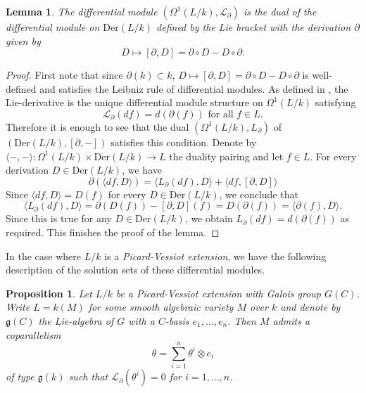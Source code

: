 \documentclass[12pt]{amsart}
\theoremstyle{definition}
\theoremstyle{plain}
\newtheorem{Prop}[defn]{Proposition}
\newtheorem{lem}[defn]{Lemma}
\theoremstyle{exampstyle}\newtheorem{thmx}{Theorem}
\theoremstyle{exampstyle}\newtheorem{thmxbis}{Theorem}
\begin{document}
\begin{lem} 
The differential module $(\Omega^1(L/k),\mathcal L_\partial)$ is the dual of the differential module on $\mathrm{Der}(L/k)$ defined by the Lie bracket with the derivation $\partial$ given by 
$$ D \mapsto  [\partial,D] = \partial \circ D - D \circ \partial.$$
\end{lem}  

\begin{proof} 
First note that since $\partial(k) \subset k$, $D \mapsto  [\partial,D] = \partial \circ D - D \circ \partial$ is well-defined and satisfies the Leibniz rule of differential modules. As defined in \cite{Rosenlicht}, the Lie-derivative is the unique differential module structure on $\Omega^1(L/k)$ satisfying 
$$ \mathcal L_\partial (df) = d (\partial(f)) \text{ for all } f \in L.$$
Therefore it is enough to see that the dual $(\Omega^1(L/k), L_\partial)$ of $(\mathrm{Der}(L/k),[\partial, - ])$ satisfies this condition. Denote by $\langle - , -\rangle: \Omega^1(L/k) \times \mathrm{Der}(L/k) \rightarrow L$ the duality pairing and let $f \in L$. For every derivation $D \in \mathrm{Der}(L/k)$, we have
$$ \partial (\langle df , D \rangle) = \langle L_\partial (df), D  \rangle + \langle df, [\partial, D] \rangle$$
Since $\langle df, D \rangle = D(f)$ for every $D \in \mathrm{Der}(L/k)$, we conclude that 
$$\langle L_\partial(df), D  \rangle = \partial(D(f)) - [\partial, D](f) = D(\partial(f)) = \langle \partial(f), D \rangle.$$
Since this is true for any $D \in \mathrm{Der}(L/k)$, we obtain $L_\partial(df) = d(\partial(f))$ as required. This finishes the proof of the lemma.
\end{proof} 

In the case where $L/k$ is a {\em Picard-Vessiot extension}, we have the following description of the solution sets of these differential modules. 


\begin{Prop}\label{proposition-vanderput}
Let $L/k$ be a Picard-Vessiot extension with Galois group $G(C)$. Write $L = k(M)$ for some smooth algebraic variety $M$ over $k$ and denote by $\mathfrak{g}(C)$ the Lie-algebra of $G$ with a $C$-basis $e_1,\ldots, e_n$. Then $M$ admits a coparallelism 
$$ \theta = \sum_{i = 1}^n \theta^i \otimes e_i $$
of type $\mathfrak{g}(k)$ such that $\mathcal L_\partial(\theta^i) = 0$ for $i = 1,\ldots, n$.
\end{Prop} 
\end{document}
